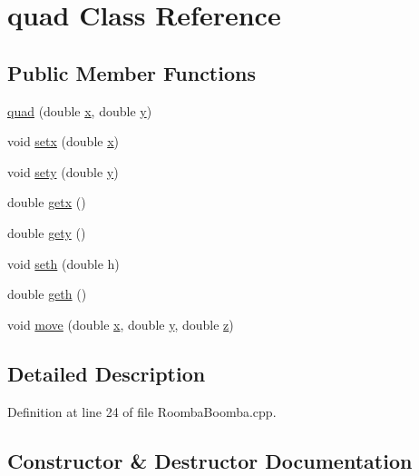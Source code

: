 \hypertarget{classquad}{}\section{quad Class Reference}
\label{classquad}
\subsection*{Public Member Functions}
\begin{DoxyCompactItemize}
\item 
\mbox{\hyperlink{classquad_ab3d2f71d3744e6e34e3bf8bea9ad8f73}{quad}} (double \mbox{\hyperlink{plottingTest_8cpp_aa0155849a1850c1edcfe7bce685b08f1}{x}}, double \mbox{\hyperlink{plottingTest_8cpp_a64d0474b77956c0e971da1b6cb1ddacd}{y}})
\item 
void \mbox{\hyperlink{classquad_a4ed6a18261e36c24c57d3443911c7278}{setx}} (double \mbox{\hyperlink{plottingTest_8cpp_aa0155849a1850c1edcfe7bce685b08f1}{x}})
\item 
void \mbox{\hyperlink{classquad_a0f2b37d06e90fedaf899fc38400dc8c4}{sety}} (double \mbox{\hyperlink{plottingTest_8cpp_a64d0474b77956c0e971da1b6cb1ddacd}{y}})
\item 
double \mbox{\hyperlink{classquad_a523cbb3471554c68e1fbb549d6ad991e}{getx}} ()
\item 
double \mbox{\hyperlink{classquad_a53d73fa22582ae9281e25eab543af569}{gety}} ()
\item 
void \mbox{\hyperlink{classquad_a798e28ed635bb3f4218067133a730123}{seth}} (double h)
\item 
double \mbox{\hyperlink{classquad_a5480be82873879e99a6ecfc7f88b9e9f}{geth}} ()
\item 
void \mbox{\hyperlink{classquad_a34d9f5dcbbd3991048401e1cbe9a5441}{move}} (double \mbox{\hyperlink{plottingTest_8cpp_aa0155849a1850c1edcfe7bce685b08f1}{x}}, double \mbox{\hyperlink{plottingTest_8cpp_a64d0474b77956c0e971da1b6cb1ddacd}{y}}, double \mbox{\hyperlink{keyTalker_8cpp_ab3e6ed577a7c669c19de1f9c1b46c872}{z}})
\end{DoxyCompactItemize}


\subsection{Detailed Description}


Definition at line 24 of file Roomba\+Boomba.\+cpp.



\subsection{Constructor \& Destructor Documentation}
\mbox{\label{classquad_ab3d2f71d3744e6e34e3bf8bea9ad8f73}} 

